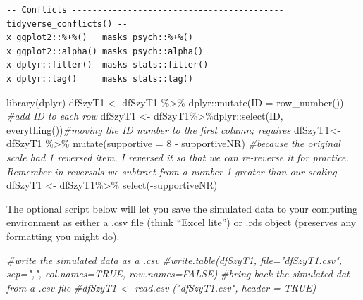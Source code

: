 \documentclass[
  english,
]{book}
\newenvironment{Shaded}{\begin{snugshade}}{\end{snugshade}}
\newcommand{\AttributeTok}[1]{\textcolor[rgb]{0.77,0.63,0.00}{#1}}
\newcommand{\CommentTok}[1]{\textcolor[rgb]{0.56,0.35,0.01}{\textit{#1}}}
\newcommand{\DecValTok}[1]{\textcolor[rgb]{0.00,0.00,0.81}{#1}}
\newcommand{\FunctionTok}[1]{\textcolor[rgb]{0.00,0.00,0.00}{#1}}
\newcommand{\NormalTok}[1]{#1}
\newcommand{\OtherTok}[1]{\textcolor[rgb]{0.56,0.35,0.01}{#1}}
\newcommand{\SpecialCharTok}[1]{\textcolor[rgb]{0.00,0.00,0.00}{#1}}
\begin{document}
\begin{verbatim}
-- Conflicts ------------------------------------------ tidyverse_conflicts() --
x ggplot2::%+%()   masks psych::%+%()
x ggplot2::alpha() masks psych::alpha()
x dplyr::filter()  masks stats::filter()
x dplyr::lag()     masks stats::lag()
\end{verbatim}

\begin{Shaded}
\begin{Highlighting}[]
\FunctionTok{library}\NormalTok{(dplyr)}
\NormalTok{dfSzyT1 }\OtherTok{\textless{}{-}}\NormalTok{ dfSzyT1 }\SpecialCharTok{\%\textgreater{}\%}\NormalTok{ dplyr}\SpecialCharTok{::}\FunctionTok{mutate}\NormalTok{(}\AttributeTok{ID =} \FunctionTok{row\_number}\NormalTok{()) }\CommentTok{\#add ID to each row}
\NormalTok{dfSzyT1 }\OtherTok{\textless{}{-}}\NormalTok{ dfSzyT1}\SpecialCharTok{\%\textgreater{}\%}\NormalTok{dplyr}\SpecialCharTok{::}\FunctionTok{select}\NormalTok{(ID, }\FunctionTok{everything}\NormalTok{())}\CommentTok{\#moving the ID number to the first column; requires}
\NormalTok{dfSzyT1}\OtherTok{\textless{}{-}}\NormalTok{ dfSzyT1 }\SpecialCharTok{\%\textgreater{}\%}
  \FunctionTok{mutate}\NormalTok{(}\AttributeTok{supportive =} \DecValTok{8} \SpecialCharTok{{-}}\NormalTok{ supportiveNR) }\CommentTok{\#because the original scale had 1 reversed item, I reversed it so that we can re{-}reverse it for practice. Remember in reversals we subtract from a number 1 greater than our scaling}
\NormalTok{dfSzyT1 }\OtherTok{\textless{}{-}}\NormalTok{ dfSzyT1}\SpecialCharTok{\%\textgreater{}\%}
  \FunctionTok{select}\NormalTok{(}\SpecialCharTok{{-}}\NormalTok{supportiveNR)}
\end{Highlighting}
\end{Shaded}

The optional script below will let you save the simulated data to your computing environment as either a .csv file (think ``Excel lite'') or .rds object (preserves any formatting you might do).

\begin{Shaded}
\begin{Highlighting}[]
\CommentTok{\#write the simulated data  as a .csv}
\CommentTok{\#write.table(dfSzyT1, file="dfSzyT1.csv", sep=",", col.names=TRUE, row.names=FALSE)}
\CommentTok{\#bring back the simulated dat from a .csv file}
\CommentTok{\#dfSzyT1 \textless{}{-} read.csv ("dfSzyT1.csv", header = TRUE)}
\end{Highlighting}
\end{Shaded}
\end{document}
